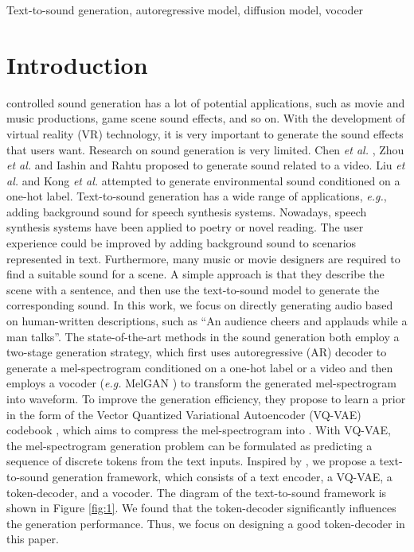 \documentclass[lettersize,journal]{IEEEtran}
\begin{document}
\begin{IEEEkeywords}
Text-to-sound generation, autoregressive model, diffusion model, vocoder
\end{IEEEkeywords}
\section{Introduction}
 controlled sound generation has a lot of potential applications, such as movie and music productions, game scene sound effects, and so on. With the development of virtual reality (VR) technology, it is very important to generate the sound effects that users want.
Research on sound generation is very limited. Chen \textit{et al.} \cite{chen2020generating}, Zhou \textit{et al.} \cite{zhou2018visual} and Iashin and Rahtu \cite{iashin2021taming} proposed to generate sound related to a video. Liu \textit{et al.} \cite{liu2021conditional} and Kong \textit{et al.} \cite{kong2019acoustic} attempted to generate environmental sound conditioned on a one-hot label. 
{\color{black}{However, at the time of this work, there are very limited published works on generating sound from text descriptions. To the best of our knowledge, this paper is among the first work in this direction. }}
Text-to-sound generation has a wide range of applications, \textit{e.g.}, adding background sound for speech synthesis systems. Nowadays, speech synthesis systems have been applied to poetry or novel reading. The user experience could be improved by adding background sound to scenarios represented in text. Furthermore, many music or movie designers are required to find a suitable sound for a scene. A simple approach is that they describe the scene with a sentence, and then use the text-to-sound model to generate the corresponding sound. In this work, we focus on directly generating audio based on human-written descriptions, such as ``An audience cheers and applauds while a man talks''.
The state-of-the-art methods \cite{iashin2021taming,liu2021conditional} in the sound generation both employ a two-stage generation strategy, which first uses autoregressive (AR) decoder to generate a mel-spectrogram conditioned on a one-hot label or a video and then employs a vocoder (\textit{e.g.} MelGAN \cite{kumar2019melgan}) to transform the generated mel-spectrogram into waveform. To improve the generation efficiency, they propose to learn a prior in the form of the Vector Quantized Variational Autoencoder (VQ-VAE) codebook \cite{van2017neural}, which aims to compress the mel-spectrogram into  {\color{black}{a token sequence}}. 
{\color{black} With VQ-VAE, the mel-spectrogram generation problem can be formulated as predicting a sequence of discrete tokens from the text inputs.}
Inspired by \cite{iashin2021taming,liu2021conditional}, we propose a text-to-sound generation framework, which consists of a text encoder, a VQ-VAE, a token-decoder, and a vocoder. The diagram of the text-to-sound framework is shown in Figure \ref{fig:1}. We found that the token-decoder significantly influences the generation performance. Thus, we focus on designing a good token-decoder in this paper.
\end{document}
